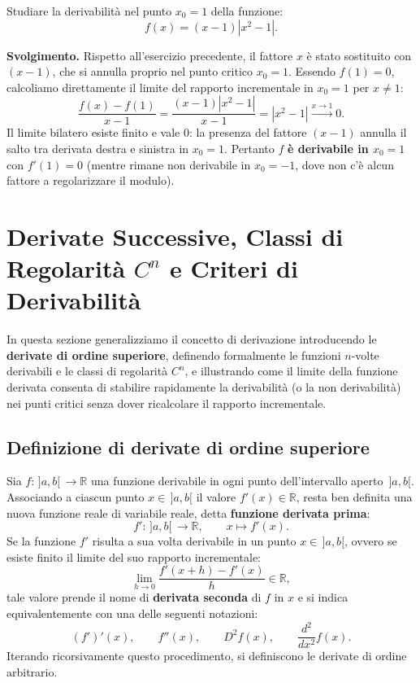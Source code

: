 \begin{esbox}[Esercizio svolto — Regolarizzazione di un punto angoloso: $f(x) = (x - 1)|x^2 - 1|$]
Studiare la derivabilità nel punto $x_0 = 1$ della funzione:
\[
    f(x) = (x - 1)|x^2 - 1|.
\]

\medskip
\noindent\textbf{Svolgimento.}
Rispetto all'esercizio precedente, il fattore $x$ è stato sostituito con $(x - 1)$, che si annulla proprio nel punto critico $x_0 = 1$. Essendo $f(1) = 0$, calcoliamo direttamente il limite del rapporto incrementale in $x_0 = 1$ per $x \neq 1$:
\[
    \frac{f(x) - f(1)}{x - 1} = \frac{(x - 1)|x^2 - 1|}{x - 1} = |x^2 - 1| \xrightarrow{x \to 1} 0.
\]
Il limite bilatero esiste finito e vale $0$: la presenza del fattore $(x - 1)$ annulla il salto tra derivata destra e sinistra in $x_0 = 1$. Pertanto $f$ \textbf{è derivabile in $x_0 = 1$} con $f'(1) = 0$ (mentre rimane non derivabile in $x_0 = -1$, dove non c'è alcun fattore a regolarizzare il modulo).
\end{esbox}

\section{Derivate Successive, Classi di Regolarità $C^n$ e Criteri di Derivabilità}

In questa sezione generalizziamo il concetto di derivazione introducendo le \textbf{derivate di ordine superiore}, definendo formalmente le funzioni $n$-volte derivabili e le classi di regolarità $C^n$, e illustrando come il limite della funzione derivata consenta di stabilire rapidamente la derivabilità (o la non derivabilità) nei punti critici senza dover ricalcolare il rapporto incrementale.

\subsection{Definizione di derivate di ordine superiore}

Sia $f \colon \,]a,b[\, \to \mathbb{R}$ una funzione derivabile in ogni punto dell'intervallo aperto $\,]a,b[$. Associando a ciascun punto $x \in \,]a,b[$ il valore $f'(x) \in \mathbb{R}$, resta ben definita una nuova funzione reale di variabile reale, detta \textbf{funzione derivata prima}:
\[
    f' \colon \,]a,b[\, \to \mathbb{R}, \qquad x \longmapsto f'(x).
\]
Se la funzione $f'$ risulta a sua volta derivabile in un punto $x \in \,]a,b[$, ovvero se esiste finito il limite del suo rapporto incrementale:
\[
    \lim_{h \to 0} \frac{f'(x+h) - f'(x)}{h} \in \mathbb{R},
\]
tale valore prende il nome di \textbf{derivata seconda} di $f$ in $x$ e si indica equivalentemente con una delle seguenti notazioni:
\[
    (f')'(x), \qquad f''(x), \qquad D^2 f(x), \qquad \frac{d^2}{dx^2} f(x).
\]
Iterando ricorsivamente questo procedimento, si definiscono le derivate di ordine arbitrario.


